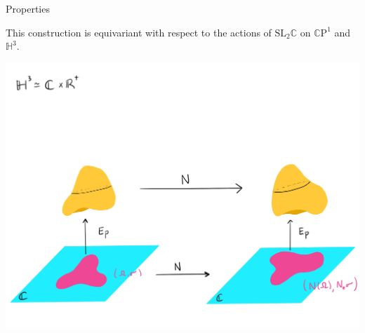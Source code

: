 \documentclass[professionalfont]{beamer}
\newcommand{\C}{\mathbb{C}}
\newcommand{\CP}{\mathbb{C}\mathrm{P}}
\renewcommand{\H}{\mathbb{H}}
\begin{document}


\begin{frame}{Properties}

This construction is equivariant with respect to the actions of $\mathrm{SL}_2\C$ on $\CP^1$ and $\H^3$. 

\centering\includegraphics[scale=0.1]{Equivariant-5.jpg}


\end{frame}


\end{document}

